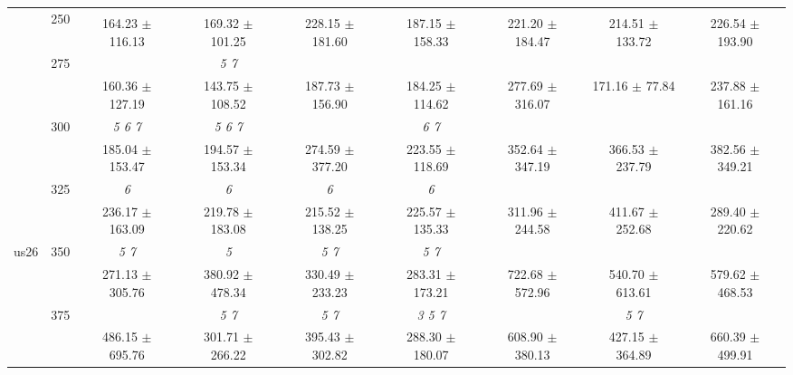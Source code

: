 \begin{table}[h]
{\begin{tabular}{
        ccccccccc}
 & \multirow{2}{*}{250}& & & & & & &  \\ 
 & & 164.23 $\pm$ 116.13& 169.32 $\pm$ 101.25& 228.15 $\pm$ 181.60& 187.15 $\pm$ 158.33& 221.20 $\pm$ 184.47& 214.51 $\pm$ 133.72& 226.54 $\pm$ 193.90 \\ 
 & \multirow{2}{*}{275}& \cellcolor[HTML]{EFEFEF} & \cellcolor[HTML]{EFEFEF} \textit{ 5 7 }& \cellcolor[HTML]{EFEFEF} & \cellcolor[HTML]{EFEFEF} & \cellcolor[HTML]{EFEFEF} & \cellcolor[HTML]{EFEFEF} & \cellcolor[HTML]{EFEFEF}  \\ 
 & & \cellcolor[HTML]{EFEFEF} 160.36 $\pm$ 127.19& \cellcolor[HTML]{EFEFEF} 143.75 $\pm$ 108.52& \cellcolor[HTML]{EFEFEF} 187.73 $\pm$ 156.90& \cellcolor[HTML]{EFEFEF} 184.25 $\pm$ 114.62& \cellcolor[HTML]{EFEFEF} 277.69 $\pm$ 316.07& \cellcolor[HTML]{EFEFEF} 171.16 $\pm$ 77.84& \cellcolor[HTML]{EFEFEF} 237.88 $\pm$ 161.16 \\ 
 & \multirow{2}{*}{300}& \textit{ 5 6 7 }& \textit{ 5 6 7 }& & \textit{ 6 7 }& & &  \\ 
 & & 185.04 $\pm$ 153.47& 194.57 $\pm$ 153.34& 274.59 $\pm$ 377.20& 223.55 $\pm$ 118.69& 352.64 $\pm$ 347.19& 366.53 $\pm$ 237.79& 382.56 $\pm$ 349.21 \\ 
 & \multirow{2}{*}{325}& \cellcolor[HTML]{EFEFEF} \textit{ 6 }& \cellcolor[HTML]{EFEFEF} \textit{ 6 }& \cellcolor[HTML]{EFEFEF} \textit{ 6 }& \cellcolor[HTML]{EFEFEF} \textit{ 6 }& \cellcolor[HTML]{EFEFEF} & \cellcolor[HTML]{EFEFEF} & \cellcolor[HTML]{EFEFEF}  \\ 
 & & \cellcolor[HTML]{EFEFEF} 236.17 $\pm$ 163.09& \cellcolor[HTML]{EFEFEF} 219.78 $\pm$ 183.08& \cellcolor[HTML]{EFEFEF} 215.52 $\pm$ 138.25& \cellcolor[HTML]{EFEFEF} 225.57 $\pm$ 135.33& \cellcolor[HTML]{EFEFEF} 311.96 $\pm$ 244.58& \cellcolor[HTML]{EFEFEF} 411.67 $\pm$ 252.68& \cellcolor[HTML]{EFEFEF} 289.40 $\pm$ 220.62 \\ 
 \multirow{4}{*}{us26} & \multirow{2}{*}{350}& \textit{ 5 7 }& \textit{ 5 }& \textit{ 5 7 }& \textit{ 5 7 }& & &  \\ 
 & & 271.13 $\pm$ 305.76& 380.92 $\pm$ 478.34& 330.49 $\pm$ 233.23& 283.31 $\pm$ 173.21& 722.68 $\pm$ 572.96& 540.70 $\pm$ 613.61& 579.62 $\pm$ 468.53 \\ 
 & \multirow{2}{*}{375}& \cellcolor[HTML]{EFEFEF} & \cellcolor[HTML]{EFEFEF} \textit{ 5 7 }& \cellcolor[HTML]{EFEFEF} \textit{ 5 7 }& \cellcolor[HTML]{EFEFEF} \textit{ 3 5 7 }& \cellcolor[HTML]{EFEFEF} & \cellcolor[HTML]{EFEFEF} \textit{ 5 7 }& \cellcolor[HTML]{EFEFEF}  \\ 
 & & \cellcolor[HTML]{EFEFEF} 486.15 $\pm$ 695.76& \cellcolor[HTML]{EFEFEF} 301.71 $\pm$ 266.22& \cellcolor[HTML]{EFEFEF} 395.43 $\pm$ 302.82& \cellcolor[HTML]{EFEFEF} 288.30 $\pm$ 180.07& \cellcolor[HTML]{EFEFEF} 608.90 $\pm$ 380.13& \cellcolor[HTML]{EFEFEF} 427.15 $\pm$ 364.89& \cellcolor[HTML]{EFEFEF} 660.39 $\pm$ 499.91 \\ 

\end{tabular}}
\end{table}
